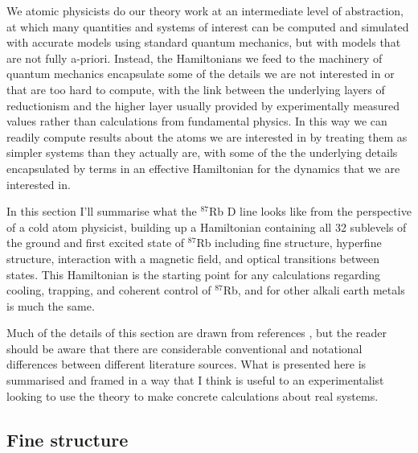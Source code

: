 We atomic physicists do our theory work at an intermediate level of abstraction, at which many quantities and systems of interest can be computed and simulated with accurate models using standard quantum mechanics, but with models that are not fully a-priori. Instead, the Hamiltonians we feed to the machinery of quantum mechanics encapsulate some of the details we are not interested in or that are too hard to compute, with the link between the underlying layers of reductionism and the higher layer usually provided by experimentally measured values rather than calculations from fundamental physics. In this way we can readily compute results about the atoms we are interested in by treating them as simpler systems than they actually are, with some of the the underlying details encapsulated by terms in an effective Hamiltonian for the dynamics that we are interested in.

In this section I'll summarise what the $^{87}$Rb D line looks like from the perspective of a cold atom physicist, building up a Hamiltonian containing all 32 sublevels of the ground and first excited state of $^{87}$Rb including fine structure, hyperfine structure, interaction with a magnetic field, and optical transitions between states. This Hamiltonian is the starting point for any calculations regarding cooling, trapping, and coherent control of $^{87}$Rb, and for other alkali earth metals is much the same.

Much of the details of this section are drawn from references \cite{steck_rubidium_2015, steck_quantum_2017, metcalf_laser_1999, king_angular_2008, farrell_consistency_1995}, but the reader should be aware that there are considerable conventional and notational differences between different literature sources. What is presented here is summarised and framed in a way that I think is useful to an experimentalist looking to use the theory to make concrete calculations about real systems.

\subsection{Fine structure}

